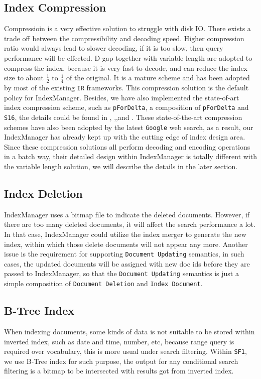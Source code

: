 \subsection{Index Compression}
Compressioin is a very effective solution to struggle with disk IO. There exists a trade off between the compressibility and decoding speed. Higher compression ratio would always lead to slower decoding, if it is too slow, then query performance will be effected. D-gap together with variable length are adopted to compress the index, because it is very fast to decode, and can reduce the index size to about $\frac{1}{2}$ to $\frac{1}{4}$ of the original. It is a mature scheme and has been adopted by most of the existing \texttt{IR} frameworks. This compression solution is the default policy for IndexManager. Besides, we have also implemented the state-of-art index compression scheme, such as \texttt{pForDelta}, a composition of \texttt{pForDelta} and \texttt{S16}, the details could be found in \cite{zukowski2006ssr}, \cite{zhang2008pci},\cite{yan2009inverted},and \cite{yan2009compressing}. These state-of-the-art
compression schemes have also been adopted by the latest \texttt{Google} web search, as a result, our IndexManager has already kept up with the cutting edge of index design area. Since these compression solutions all perform decoding and encoding operations in a batch way, their detailed design within IndexManager is totally different with the variable length solution, we will describe the details in the later section.

\subsection{Index Deletion}
IndexManager uses a bitmap file to indicate the deleted documents. However, if there are too many deleted documents, it will affect the search performance a lot. In that case, IndexManager could utilize the index merger to generate
the new index, within which those delete documents will not appear any more. Another issue is the requirement for supporting \texttt{Document Updating} semantics, in such cases, the updated documents will be assigned with new doc 
ids before they are passed to IndexManager, so that the \texttt{Document Updating} semantics is just a simple composition of \texttt{Document Deletion} and \texttt{Index Document}.

\subsection{B-Tree Index}
When indexing documents, some kinds of data is not suitable to be stored within inverted index, such as date and time, number, etc, because range query is required over vocabulary, 
this is more usual under search filtering. Within \texttt{SF1}, we use B-Tree index for such purpose, the output for any conditional search filtering is a bitmap to be intersected
with results got from inverted index.

